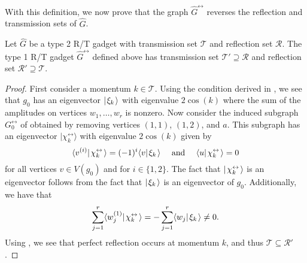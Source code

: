 \documentclass[../thesis-main/thesis-main]{subfiles}
\begin{document}
With this definition, we now prove that the graph $\widehat{G}^\leftrightarrow$ reverses the reflection and transmission sets of $\widehat{G}$.

\begin{lemma}\label{lem:reversal_graph}
Let $\widehat{G}$ be a type 2 R/T gadget with transmission set $\mathcal{T}$ and reflection set $\mathcal{R}$.  The type 1 R/T gadget $\widehat{G}^{\leftrightarrow}$ defined above has transmission set $\mathcal{T}' \supseteq \mathcal{R}$ and reflection set $\mathcal{R}' \supseteq \mathcal{T}$.
\end{lemma}
\begin{proof}
First consider a momentum $k\in \mathcal{T}$. Using the condition derived in , we see that $g_0$ has an eigenvector $|\mspace{2mu} \xi_k \mspace{2mu} \rangle$ with eigenvalue $2\cos(k)$ where the sum of the amplitudes on vertices $w_1,\ldots,w_r$ is nonzero.  Now consider the induced subgraph $G_{0}^{\leftrightarrow}$ of  obtained by removing vertices $(1,1)$, $(1,2)$, and $a$. This subgraph has an eigenvector $|\chi^{\leftrightarrow}_k\rangle$ with eigenvalue $2\cos(k)$ given by
\begin{equation}
  \langle v^{(i)} |\mspace{2mu} \chi^{\leftrightarrow}_k \mspace{2mu} \rangle= (-1)^i \langle v|\mspace{2mu} \xi_k \mspace{2mu} \rangle \quad \text{ and } \quad \langle{u}|\mspace{2mu} \chi^{\leftrightarrow}_k \mspace{2mu} \rangle = 0
\end{equation}
for all vertices $v\in V(g_0)$ and for $i \in \{1,2\}$.  The fact that $|\mspace{2mu} \chi_k^{\leftrightarrow} \mspace{2mu} \rangle$ is an eigenvector follows from the fact that $|\mspace{2mu} \xi_k \mspace{2mu} \rangle$ is an eigenvector of $g_0$.  Additionally, we have that
\begin{equation}
  \sum_{j=1}^{r} \langle{w^{(1)}_j} |\mspace{2mu} \chi^{\leftrightarrow}_k \mspace{2mu} \rangle = - \sum_{j=1}^{r} \langle{w_j} |\mspace{2mu} \xi_k \mspace{2mu} \rangle \neq 0.
\end{equation}
Using , we see that perfect reflection occurs at momentum $k$, and thus $\mathcal{T} \subseteq \mathcal{R}'$.


\end{proof}
\end{document}
